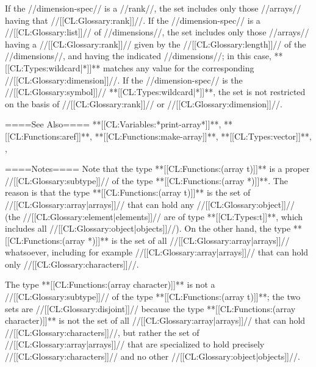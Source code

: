 If the //dimension-spec// is a //rank//, the set includes only those //arrays// having that //[[CL:Glossary:rank]]//. If the //dimension-spec// is a //[[CL:Glossary:list]]// of //dimensions//, the set includes only those //arrays// having a //[[CL:Glossary:rank]]// given by the //[[CL:Glossary:length]]// of the //dimensions//, and having the indicated //dimensions//; in this case, **[[CL:Types:wildcard|*]]** matches any value for the corresponding //[[CL:Glossary:dimension]]//. If the //dimension-spec// is the //[[CL:Glossary:symbol]]// **[[CL:Types:wildcard|*]]**, the set is not restricted on the basis of //[[CL:Glossary:rank]]// or //[[CL:Glossary:dimension]]//.

====See Also====
**[[CL:Variables:*print-array*]]**, **[[CL:Functions:aref]]**, **[[CL:Functions:make-array]]**, **[[CL:Types:vector]]**, {\secref\SharpsignA}, {\secref\PrintingOtherArrays}

====Notes====
Note that the type **[[CL:Functions:(array t)]]** is a proper //[[CL:Glossary:subtype]]// of the type **[[CL:Functions:(array *)]]**. The reason is that the type **[[CL:Functions:(array t)]]** is the set of //[[CL:Glossary:array|arrays]]// that can hold any //[[CL:Glossary:object]]// (the //[[CL:Glossary:element|elements]]// are of type **[[CL:Types:t]]**, which includes all //[[CL:Glossary:object|objects]]//). On the other hand, the type **[[CL:Functions:(array *)]]** is the set of all //[[CL:Glossary:array|arrays]]// whatsoever, including for example //[[CL:Glossary:array|arrays]]// that can hold only //[[CL:Glossary:characters]]//.

The type **[[CL:Functions:(array character)]]** is not a //[[CL:Glossary:subtype]]// of the type **[[CL:Functions:(array t)]]**; the two sets are //[[CL:Glossary:disjoint]]// because the type **[[CL:Functions:(array character)]]** is not the set of all //[[CL:Glossary:array|arrays]]// that can hold //[[CL:Glossary:characters]]//, but rather the set of //[[CL:Glossary:array|arrays]]// that are specialized to hold precisely //[[CL:Glossary:characters]]// and no other //[[CL:Glossary:object|objects]]//.

